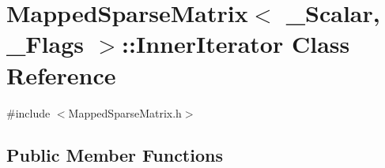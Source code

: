 \hypertarget{class_mapped_sparse_matrix_1_1_inner_iterator}{\section{Mapped\-Sparse\-Matrix$<$ \-\_\-\-Scalar, \-\_\-\-Flags $>$\-:\-:Inner\-Iterator Class Reference}
\label{class_mapped_sparse_matrix_1_1_inner_iterator}
}


{\ttfamily \#include $<$Mapped\-Sparse\-Matrix.\-h$>$}

\subsection*{Public Member Functions}
